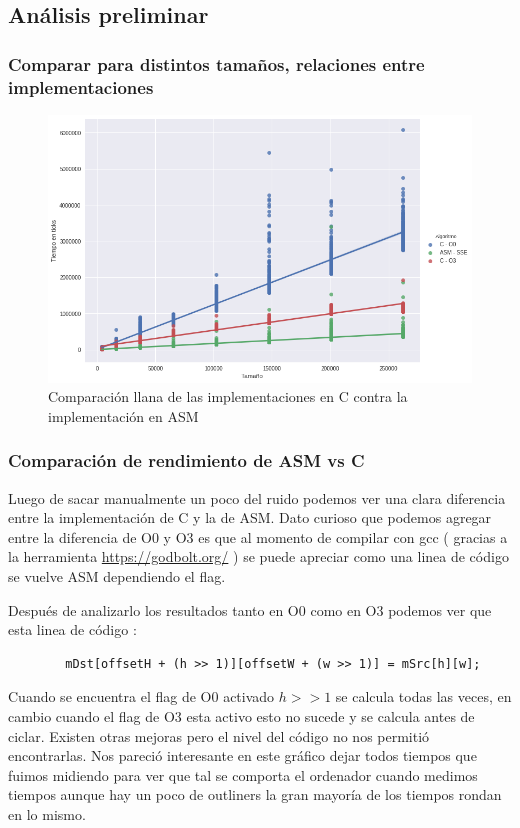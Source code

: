 \subsection{Análisis preliminar}
\subsubsection*{Comparar para distintos tamaños, relaciones entre implementaciones}
\begin{figure}[H]
\centering
\includegraphics[scale=0.5]{img/fourCombine_CvsASM.png}
\caption{Comparación llana de las implementaciones en C contra la implementación en ASM}
\label{sec:ticksciclo}
\end{figure}
\subsubsection*{Comparación de rendimiento de ASM vs C}
Luego de sacar manualmente un poco del ruido podemos ver una clara diferencia entre la implementación de C y la de ASM. Dato curioso que podemos agregar entre la diferencia de O0 y O3 es que al momento de compilar con gcc ( gracias a la herramienta \url{https://godbolt.org/} ) se puede apreciar como una linea de código se vuelve ASM dependiendo el flag. 

Después de analizarlo los resultados tanto en O0 como en O3 podemos ver que esta linea de código :

\begin{lstlisting}
		mDst[offsetH + (h >> 1)][offsetW + (w >> 1)] = mSrc[h][w];
\end{lstlisting}

Cuando se encuentra el flag de O0 activado $h >> 1$ se calcula todas las veces, en cambio cuando el flag de O3 esta activo esto no sucede y se calcula antes de ciclar. Existen otras mejoras pero el nivel del código no nos permitió encontrarlas. Nos pareció interesante en este gráfico dejar todos tiempos que fuimos midiendo para ver que tal se comporta el ordenador cuando medimos tiempos aunque hay un poco de outliners la gran mayoría de los tiempos rondan en lo mismo.


